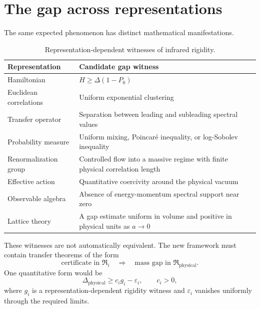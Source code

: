 \documentclass[11pt]{article}
\begin{document}
\section{The gap across representations}

The same expected phenomenon has distinct mathematical manifestations.

\begin{table}[ht]
\centering
\small
\renewcommand{\arraystretch}{1.2}
\begin{tabularx}{\textwidth}{>{\raggedright\arraybackslash}p{}X}
\toprule
\textbf{Representation} & \textbf{Candidate gap witness} \\
\midrule
Hamiltonian
  & $H\geq\Delta(1-P_0)$ \\
Euclidean correlations
  & Uniform exponential clustering \\
Transfer operator
  & Separation between leading and subleading spectral values \\
Probability measure
  & Uniform mixing, Poincar\'e inequality, or log-Sobolev inequality \\
Renormalization group
  & Controlled flow into a massive regime with finite physical correlation length \\
Effective action
  & Quantitative coercivity around the physical vacuum \\
Observable algebra
  & Absence of energy-momentum spectral support near zero \\
Lattice theory
  & A gap estimate uniform in volume and positive in physical units as $a\to0$ \\
\bottomrule
\end{tabularx}
\caption{Representation-dependent witnesses of infrared rigidity.}
\label{tab:gap-witnesses}
\end{table}

These witnesses are not automatically equivalent.  The new framework must
contain transfer theorems of the form
\begin{equation}
  \text{certificate in }\mathfrak R_i
  \quad\Longrightarrow\quad
  \text{mass gap in }\mathfrak R_{\mathrm{physical}}.
  \label{eq:transfer-pattern}
\end{equation}
One quantitative form would be
\begin{equation}
  \Delta_{\mathrm{physical}}
  \geq c_i g_i-\varepsilon_i,
  \qquad c_i>0,
  \label{eq:gap-bound}
\end{equation}
where $g_i$ is a representation-dependent rigidity witness and
$\varepsilon_i$ vanishes uniformly through the required limits.
\end{document}
